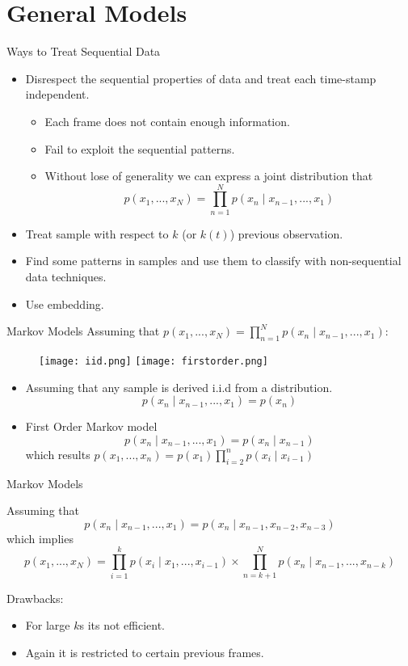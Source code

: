 \documentclass{beamer}
\begin{document}
\section{General Models}
	\begin{frame}{Ways to Treat Sequential Data}
		\begin{itemize}
			\item<1-> Disrespect the sequential properties of data and treat each time-stamp independent. \begin{itemize}
				\item<2-> Each frame does not contain enough information.
				\item<3-> Fail to exploit the sequential patterns.
				
			\item<4-> Without lose of generality we can express a joint distribution that \[ p(x_1 , ... , x_N)  = \prod_{n = 1}^{N}p(x_n \mid x_{n - 1},...,x_1) \] 
			
			\end{itemize}
		\item<5-> Treat sample with respect to $k$ (or $k(t)$) previous observation.
		\item<6-> Find some patterns in samples and use them to classify with non-sequential data techniques.
		\item<7-> Use embedding.
		\end{itemize}
	\end{frame}

	\begin{frame}{Markov Models}
		Assuming that $ p(x_1 , ... , x_N)  = \prod_{n = 1}^{N}p(x_n \mid x_{n - 1},...,x_1) $:
		\begin{figure}\centering \texttt{[image: iid.png]}
			\texttt{[image: firstorder.png]}\end{figure} 
		\begin{itemize} 
			\item Assuming that any sample is derived i.i.d from a distribution. \[ p(x_n\mid x_{n - 1},...,x_1) = p(x_n) \] \pause
			\item First Order Markov model \[ p(x_n\mid x_{n - 1},..., x_{1}) = p(x_n\mid x_{n - 1}) \] which results $p(x_1, ... , x_n) = p(x_1)\prod_{i = 2}^{n}p(x_i \mid x_{i - 1})$ 
		\end{itemize}
	\end{frame}

	\begin{frame}{Markov Models}
		\begin{definition}
			Assuming that \[ p(x_n\mid x_{n-1}, ... , x_1) = p(x_n\mid x_{n - 1}, x_{n - 2}, x_{n - 3}) \] which implies \[ p(x_1 , ... , x_N) = \prod_{i = 1}^{k} p(x_i \mid x_1 , ... , x_{i - 1}) \times \prod_{n = k+1}^{N} p(x_n\mid x_{n - 1},...,x_{n - k}) \]
		\end{definition}
	\pause
		\alert{Drawbacks:} \begin{itemize}
			\item For large $k$s its not efficient. 
			\item Again it is restricted to certain previous frames.
		\end{itemize} 
	\end{frame}	
	
\end{document}
